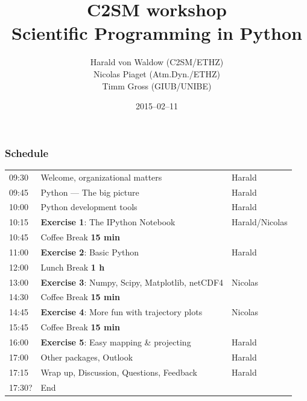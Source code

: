 \documentclass[xcolor=pdftex,dvipsnames,table]{beamer}
\title{C2SM workshop\\Scientific Programming in Python}
\author{
  Harald von Waldow {\tiny(C2SM/ETHZ)}\\
  Nicolas Piaget {\tiny(Atm.Dyn./ETHZ)}\\
  Timm Gross {\tiny(GIUB/UNIBE)}
}
\date{2015--02--11}
\begin{document}

\begin{frame}
  \titlepage%
\end{frame}


\usebackgroundtemplate{}
\begin{frame}
  \frametitle{Schedule}

\small{
\begin{tabular}{p{1cm}|l|p{2cm}}

  \rowcolor{lightgray}09:30 & Welcome, organizational matters & Harald\\
  \rowcolor{lightgray}09:45 & Python --- The big picture & Harald\\

  \rowcolor{lightgray}10:00 & Python development tools & Harald\\
  \rowcolor{cyan}10:15 & \textbf{Exercise 1}: The IPython Notebook & Harald/Nicolas\\
  \rowcolor{orange}10:45 & Coffee Break \textbf{15 min}&\\
  \rowcolor{cyan}11:00 & \textbf{Exercise 2}: Basic Python & Harald\\
  \rowcolor{orange}12:00 & Lunch Break \textbf{1 h} &\\
  \rowcolor{cyan}13:00 & \textbf{Exercise 3}: Numpy, Scipy, Matplotlib, netCDF4 & Nicolas\\
  \rowcolor{orange}14:30 & Coffee Break \textbf{15 min}&\\
  \rowcolor{cyan}14:45 & \textbf{Exercise 4}: More fun with trajectory plots & Nicolas\\
  \rowcolor{orange}15:45 & Coffee Break \textbf{15 min}&\\
  \rowcolor{cyan}16:00 & \textbf{Exercise 5}: Easy mapping \& projecting & Harald\\
  \rowcolor{lightgray}17:00 & Other packages, Outlook & Harald\\
  \rowcolor{lightgray}17:15 & Wrap up, Discussion, Questions, Feedback & Harald\\
  \rowcolor{lightgray}17:30? & End &\\

\end{tabular}
}
\end{frame}
\end{document}
